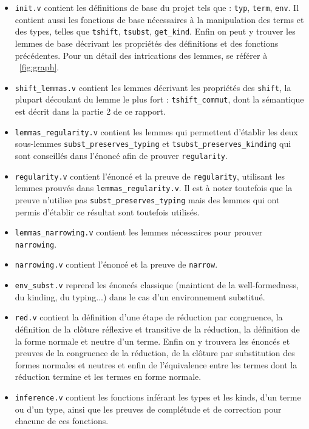 \documentclass[a4paper,10pt]{scrartcl}
\begin{document}
     \begin{itemize}
      \item \texttt{init.v} contient les définitions de base du projet tels que : \texttt{typ}, \texttt{term}, \texttt{env}. Il contient aussi les fonctions de base nécessaires à la manipulation des terms et des types, telles que \texttt{tshift}, \texttt{tsubst}, \texttt{get\_kind}. Enfin on peut y trouver les lemmes de base décrivant les propriétés des définitions et des fonctions précédentes. Pour un détail des intrications des lemmes, se référer à ~\ref{fig:graph}.
      \item \texttt{shift\_lemmas.v} contient les lemmes décrivant les propriétés des \texttt{shift}, la plupart découlant du lemme le plus fort : \texttt{tshift\_commut}, dont la sémantique est décrit dans la partie 2 de ce rapport.
      \item \texttt{lemmas\_regularity.v} contient les lemmes qui permettent d'établir les deux sous-lemmes \texttt{subst\_preserves\_typing} et \texttt{tsubst\_preserves\_kinding} qui sont conseillés dans l'énoncé afin de prouver \texttt{regularity}.
      \item \texttt{regularity.v} contient l'énoncé et la preuve de \texttt{regularity}, utilisant les lemmes prouvés dans \texttt{lemmas\_regularity.v}. Il est à noter toutefois que la preuve n'utilise pas \texttt{subst\_preserves\_typing} mais des lemmes qui ont permis d'établir ce résultat sont toutefois utilisés.
      \item \texttt{lemmas\_narrowing.v} contient les lemmes nécessaires pour prouver \texttt{narrowing}.
      \item \texttt{narrowing.v} contient l'énoncé et la preuve de \texttt{narrow}.
      \item {\tt env\_subst.v} reprend les énoncés classique (maintient de la well-formedness, du kinding, du typing...) dans le cas d'un environnement substitué.
      \item \texttt{red.v} contient la définition d'une étape de réduction par congruence, la définition de la clôture réflexive et transitive de la réduction, la définition de la forme normale et neutre d'un terme. Enfin on y trouvera les énoncés et preuves de la congruence de la réduction, de la clôture par substitution des formes normales et neutres et enfin de l'équivalence entre les termes dont la réduction termine et les termes en forme normale.
      \item \texttt{inference.v} contient les fonctions inférant les types et les kinds, d'un terme ou d'un type, ainsi que les preuves de complétude et de correction pour chacune de ces fonctions.
     \end{itemize}
\end{document}

